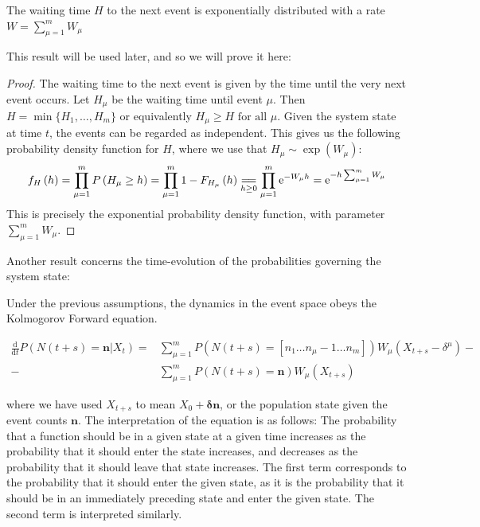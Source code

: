 \documentclass[10pt,a4paper]{article}
\begin{document}
\begin{lemma} \label{lemma:exponential}
	The waiting time $H$ to the next event is exponentially distributed with a rate $W = \sum_{\mu=1}^m W_\mu$
\end{lemma}

This result will be used later, and so we will prove it here:

\begin{proof}
	The waiting time to the next event is given by the time until the very next event occurs. Let $H_\mu$ be the waiting time until event $\mu$. Then	$H = \min \{ H_1, \ldots, H_m \}$ or equivalently $H_\mu \geq H \textrm{ for all } \mu$. Given the system state at time $t$, the events can be regarded as independent. This gives us the following probability density function for $H$, where we use that $H_\mu \sim \exp \left( W_\mu \right)$:
	\begin{align*}
		f_{H} \left( h \right) = \prod_{\mu = 1}^m P \left( H_\mu \geq h \right) = \prod_{\mu =1}^m 1 - F_{H_\mu}\left( h \right) \underset{h\geq 0}{=\joinrel=} \prod_{\mu = 1}^m \mathrm{e}^{-W_{\mu} h} = \mathrm{e}^{- h \sum_{\mu = 1}^m W_\mu}
	\end{align*}
	This is precisely the exponential probability density function, with parameter $\sum_{\mu = 1}^m W_\mu$.
\end{proof}

Another result concerns the time-evolution of the probabilities governing the system state:

\begin{theorem}
	Under the previous assumptions, the dynamics in the event space obeys the Kolmogorov Forward equation.
	
	\begin{align}
		\frac{\textrm{d}}{\textrm{d}t} P \left( N \left( t + s \right) = \bm{n} | X_t \right) =
		&  \sum_{\mu = 1}^m P \left( N \left( t + s \right) = \left[ n_1 \ldots n_\mu - 1 \ldots n_m \right] \right) W_{\mu} \left( X_ {t+s} - \delta^{\mu} \right) - \\
		- & \sum_{\mu = 1}^m P \left( N \left( t + s \right) = \bm{n} \right) W_{\mu} \left( X_{t+s} \right) \label{eq:kolmogorov_forward}
	\end{align} \label{th:kolmogorov_forward}
\end{theorem}

where we have used $X_{t+s}$ to mean $X_0 + \bm{\delta}\bm{n}$, or the population state given the event counts $\bm{n}$. The interpretation of the equation is as follows: The probability that a function should be in a given state at a given time increases as the probability that it should enter the state increases, and decreases as the probability that it should leave that state increases. The first term corresponds to the probability that it should enter the given state, as it is the probability that it should be in an immediately preceding state and enter the given state. The second term is interpreted similarly.
\end{document}
